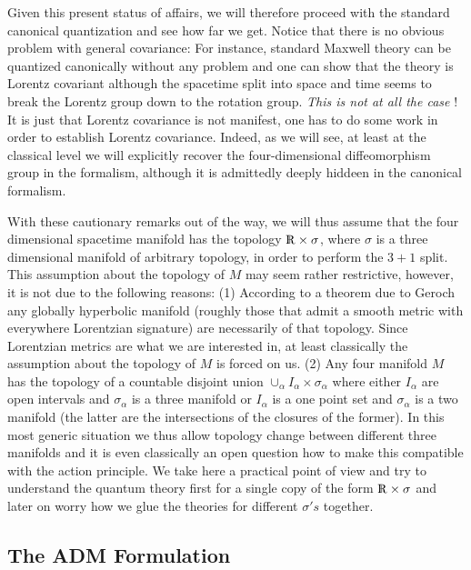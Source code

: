 \documentclass[12pt]{report}
\def\Rl{{\mathchoice
{\setbox0=\hbox{$\displaystyle\rm R$}\hbox{\hbox to0pt
{\kern0.4\wd0\vrule height0.9\ht0\hss}\box0}}
{\setbox0=\hbox{$\textstyle\rm R$}\hbox{\hbox to0pt
{\kern0.4\wd0\vrule height0.9\ht0\hss}\box0}}
{\setbox0=\hbox{$\scriptstyle\rm R$}\hbox{\hbox to0pt
{\kern0.4\wd0\vrule height0.9\ht0\hss}\box0}}
{\setbox0=\hbox{$\scriptscriptstyle\rm R$}\hbox{\hbox to0pt
{\kern0.4\wd0\vrule height0.9\ht0\hss}\box0}}}}
\begin{document}
Given this present status of affairs, we will therefore proceed with the 
standard canonical quantization and see how far we get. Notice that there
is no obvious problem with general covariance: 
For instance, standard Maxwell theory
can be quantized canonically without any problem and one can show that
the theory is Lorentz covariant although the spacetime split into space 
and time seems to break the Lorentz group down to the rotation group. 
{\it This is not at all the case} ! It is just that Lorentz covariance is 
not manifest, one has to do some work in order to establish Lorentz 
covariance.
Indeed, as we will see, at least at the classical level we will explicitly
recover the four-dimensional diffeomorphism group in the formalism, although
it is admittedly deeply hiddeen in the canonical formalism.

With these cautionary remarks out of the way, we will thus assume that 
the four dimensional spacetime manifold has the topology $\Rl\times \sigma$,
where $\sigma$ is a three dimensional manifold of arbitrary topology, in 
order to perform the $3+1$ split. This assumption about the topology of
$M$ may seem rather restrictive, however, it is not due to the following 
reasons: (1) According to a theorem due to Geroch any globally hyperbolic 
manifold (roughly those that admit a smooth metric with everywhere 
Lorentzian 
signature) are necessarily of that topology. Since Lorentzian metrics are 
what we are interested in, at least classically the assumption about the 
topology of $M$ is forced on us. (2) Any four manifold $M$ has the topology  
of a countable disjoint union $\cup_\alpha I_\alpha\times \sigma_\alpha$ 
where either 
$I_\alpha$ are open intervals and $\sigma_\alpha$ is a three manifold or 
$I_\alpha$ is a one point set and $\sigma_\alpha$ is a two manifold (the 
latter are the intersections of the closures of the former). In this 
most generic situation we thus allow topology change between different
three manifolds and it is even classically an open question how to make this
compatible with the action principle. We take here a practical point of 
view and try to understand the quantum theory first for a single copy 
of the form $\Rl\times \sigma$ and later on worry how we glue the theories
for different $\sigma's$ together.

\subsection{The ADM Formulation}
\label{s1.2.1}
\end{document}
